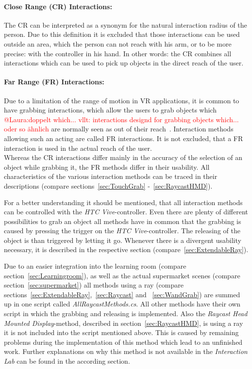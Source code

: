 \paragraph{Close Range (CR) Interactions:} The CR can be interpreted as a synonym for the natural interaction radius of the person. Due to this definition it is excluded that those interactions can be used outside an area, which the person can not reach with his arm, or to be more precise: with the controller in his hand. In other words: the CR combines all interactions which can be used to pick up objects in the direct reach of the user.

\paragraph{Far Range (FR) Interactions:} Due to a limitation of the range of motion in VR applications, it is common to have grabbing interactions, which allow the users to grab objects which \textcolor{red}{@Laura:doppelt which... vllt: interactions designd for grabbing objects which... oder so ähnlich} are normally seen as out of their reach~\cite{VRBook}. Interaction methods allowing such an acting are called FR interactions. It is not excluded, that a FR interaction is used in the actual reach of the user. \\

Whereas the CR interactions differ mainly in the accuracy of the selection of an object while grabbing it, the FR methods differ in their usability. All characteristics of the various interaction methods can be traced in their descriptions (compare sections~\ref{sec:TouchGrab} -~\ref{sec:RaycastHMD}).

For a better understanding it should be mentioned, that all interaction methods can be controlled with the \textit{HTC Vive}-controller. Even there are plenty of different possibilities to grab an object all methods have in common that the grabbing is caused by pressing the trigger on the \textit{HTC Vive}-controller. The releasing of the object is than triggered by letting it go. Whenever there is a divergent usability necessary, it is described in the respective section (compare~\ref{sec:ExtendableRay}).

Due to an easier integration into the learning room (compare section~\ref{sec:Learningroom}), as well as the actual supermarket scenes (compare section~\ref{sec:supermarket}) all methods using a ray (compare sections~\ref{sec:ExtendableRay},~\ref{sec:Raycast} and ~\ref{sec:WandGrab}) are summed up in one script called \textit{AllRaycastMethods.cs}. All other methods have their own script in which the grabbing and releasing is implemented. Also the \textit{Raycast Head Mounted Display}-method, described in section~\ref{sec:RaycastHMD}, is using a ray it is not included into the script mentioned above. This is caused by remaining problems during the implementation of this method which lead to an unfinished work. Further explanations on why this method is not available in the \textit{Interaction Lab} can be found in the according section.

